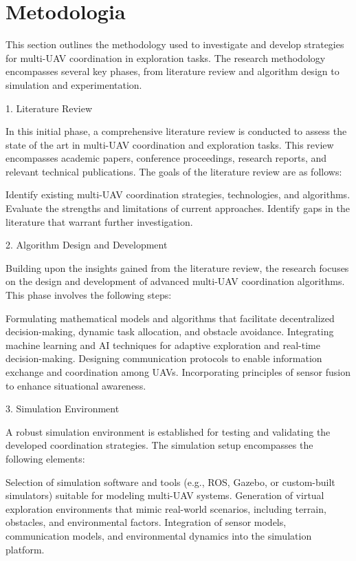 \documentclass[sigconf]{acmart}
\begin{document}
\section{Metodologia}

This section outlines the methodology used to investigate and develop strategies for multi-UAV coordination in exploration tasks. The research methodology encompasses several key phases, from literature review and algorithm design to simulation and experimentation.

1. Literature Review

In this initial phase, a comprehensive literature review is conducted to assess the state of the art in multi-UAV coordination and exploration tasks. This review encompasses academic papers, conference proceedings, research reports, and relevant technical publications. The goals of the literature review are as follows:

    Identify existing multi-UAV coordination strategies, technologies, and algorithms.
    Evaluate the strengths and limitations of current approaches.
    Identify gaps in the literature that warrant further investigation.

2. Algorithm Design and Development

Building upon the insights gained from the literature review, the research focuses on the design and development of advanced multi-UAV coordination algorithms. This phase involves the following steps:

    Formulating mathematical models and algorithms that facilitate decentralized decision-making, dynamic task allocation, and obstacle avoidance.
    Integrating machine learning and AI techniques for adaptive exploration and real-time decision-making.
    Designing communication protocols to enable information exchange and coordination among UAVs.
    Incorporating principles of sensor fusion to enhance situational awareness.

3. Simulation Environment

A robust simulation environment is established for testing and validating the developed coordination strategies. The simulation setup encompasses the following elements:

    Selection of simulation software and tools (e.g., ROS, Gazebo, or custom-built simulators) suitable for modeling multi-UAV systems.
    Generation of virtual exploration environments that mimic real-world scenarios, including terrain, obstacles, and environmental factors.
    Integration of sensor models, communication models, and environmental dynamics into the simulation platform.
\end{document}
